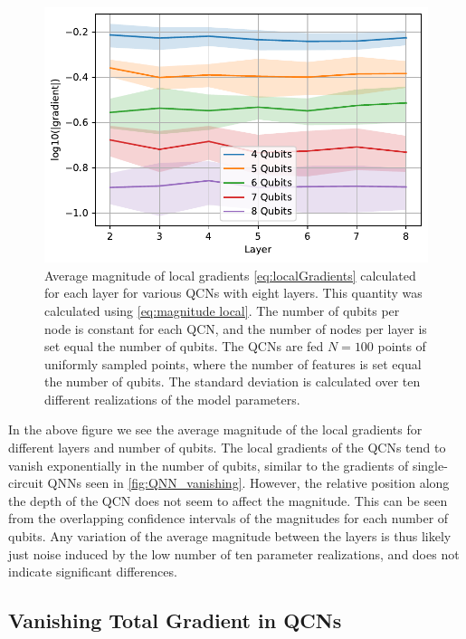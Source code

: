 \begin{figure}[H]
    \centering
    \includegraphics[width=12cm]{latex/figures/vanishing_gradient_partial_input.pdf}
    \caption{Average magnitude of local gradients \autoref{eq:localGradients} calculated for each layer for various QCNs with eight layers. This quantity was calculated using \autoref{eq:magnitude local}. The number of qubits per node is constant for each QCN, and the number of nodes per layer is set equal the number of qubits. The QCNs are fed $N=100$ points of uniformly sampled points, where the number of features is set equal the number of qubits. The standard deviation is calculated over ten different realizations of the model parameters.}
    \label{fig:QCN_local_vanishing}
\end{figure}

In the above figure we see the average magnitude of the local gradients for different layers and number of qubits. The local gradients of the QCNs tend to vanish exponentially in the number of qubits, similar to the gradients of single-circuit QNNs seen in \autoref{fig:QNN_vanishing}. However, the relative position along the depth of the QCN does not seem to affect the magnitude. This can be seen from the overlapping confidence intervals of the magnitudes for each number of qubits. Any variation of the average magnitude between the layers is thus likely just noise induced by the low number of ten parameter realizations, and does not indicate significant differences.

\subsection{Vanishing Total Gradient in QCNs}\label{sec:Vanishing Total Gradients in QCNs}

